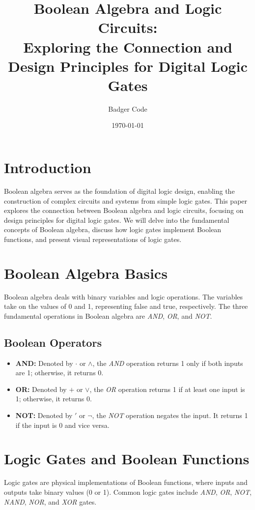 \documentclass{article}
\title{Boolean Algebra and Logic Circuits: \\
       Exploring the Connection and Design Principles for Digital Logic Gates}
\author{Badger Code}
\date{\today}
\begin{document}
\maketitle

\section{Introduction}
Boolean algebra serves as the foundation of digital logic design, enabling the construction of complex circuits and systems from simple logic gates. This paper explores the connection between Boolean algebra and logic circuits, focusing on design principles for digital logic gates. We will delve into the fundamental concepts of Boolean algebra, discuss how logic gates implement Boolean functions, and present visual representations of logic gates.

\section{Boolean Algebra Basics}
Boolean algebra deals with binary variables and logic operations. The variables take on the values of 0 and 1, representing false and true, respectively. The three fundamental operations in Boolean algebra are \textit{AND}, \textit{OR}, and \textit{NOT}.

\subsection{Boolean Operators}
\begin{itemize}
    \item \textbf{AND:} Denoted by $\cdot$ or $\land$, the \textit{AND} operation returns 1 only if both inputs are 1; otherwise, it returns 0.
    \item \textbf{OR:} Denoted by $+$ or $\lor$, the \textit{OR} operation returns 1 if at least one input is 1; otherwise, it returns 0.
    \item \textbf{NOT:} Denoted by $'$ or $\lnot$, the \textit{NOT} operation negates the input. It returns 1 if the input is 0 and vice versa.
\end{itemize}

\section{Logic Gates and Boolean Functions}
Logic gates are physical implementations of Boolean functions, where inputs and outputs take binary values (0 or 1). Common logic gates include \textit{AND}, \textit{OR}, \textit{NOT}, \textit{NAND}, \textit{NOR}, and \textit{XOR} gates.
\end{document}
